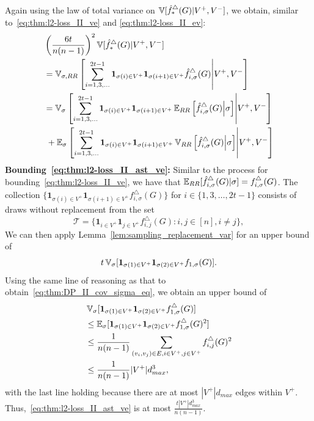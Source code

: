Again using the law of total variance on $\operatorname{\mathbb{V}}[\hat{f}_*^\triangle(G)|V^+,V^-]$, we
obtain, similar to~\eqref{eq:thm:l2-loss_II_ve} and \eqref{eq:thm:l2-loss_II_ev}:
\begin{align}
  &\left(\frac{6t}{n(n-1)}\right)^2\operatorname{\mathbb{V}}[\hat{f}_*^\triangle(G)|V^+,V^-] \nonumber \\
  &=\operatorname{\mathbb{V}}_{\sigma,RR}\left[\sum_{i=1,3,\ldots}^{2t-1} \textbf{1}_{\sigma(i)\in
  V^+}\textbf{1}_{\sigma(i+1) \in V^+} \hat{f}_{i,\sigma}^\triangle(G)\middle| V^+,V^-\right] \nonumber \\
  &=\operatorname{\mathbb{V}}_{\sigma} \left[ \sum_{i=1,3,\ldots}^{2t-1} \textbf{1}_{\sigma(i) \in
  V^+}\textbf{1}_{\sigma(i+1) \in V^+}\operatorname{\mathbb{E}}_{RR}\left[\hat{f}_{i,\sigma}^\triangle(G)\middle|
  \sigma \right]\middle| V^+,V^-\right]\label{eq:thm:l2-loss_II_ast_ve} \\
  &\hspace{1mm} +\operatorname{\mathbb{E}}_{\sigma} \left[\sum_{i=1,3,\ldots}^{2t-1}\textbf{1}_{\sigma(i) \in
  V^+}\textbf{1}_{\sigma(i+1) \in V^+}\operatorname{\mathbb{V}}_{RR}\left[\hat{f}_{i,\sigma}^\triangle(G)\middle|
  \sigma \right]\middle| V^+,V^-\right]\label{eq:thm:l2-loss_II_ast_ev}
\end{align}
\noindent\textbf{Bounding~\eqref{eq:thm:l2-loss_II_ast_ve}:}
Similar to the process for bounding~\eqref{eq:thm:l2-loss_II_ve}, we have that
$\operatorname{\mathbb{E}}_{RR}[\hat{f}_{i,\sigma}^\triangle(G)|\sigma] = f_{i,\sigma}^\triangle(G)$. The
collection $\{\textbf{1}_{\sigma(i) \in V^+}\textbf{1}_{\sigma(i+1)\in V^+}
\allowbreak f_{i,\sigma}^\triangle(G) \}$ for $i \in \{1, 3, \ldots, 2t-1\}$ consists of draws without replacement from the set
\[
  \mathcal{T} = \{\textbf{1}_{i \in V^+} \textbf{1}_{j \in V^+}
  f_{i,j}^\triangle(G) : i,j \in [n], i \neq j\},
\]
We can then apply Lemma~\ref{lem:sampling_replacement_var} for
an upper bound of
\[t \operatorname{\mathbb{V}}_\sigma[\textbf{1}_{\sigma(1)\in
V^+}\textbf{1}_{\sigma(2) \in V^+}f_{1,\sigma}(G)].\] Using the same line of
reasoning as that to obtain~\eqref{eq:thm:DP_II_cov_sigma_eq}, we obtain an
upper bound of
\begin{align*}
  &\operatorname{\mathbb{V}}_\sigma[\textbf{1}_{\sigma(1)\in
  V^+}\textbf{1}_{\sigma(2) \in V^+}f^\triangle_{1,\sigma}(G)] \\
  &\leq
  \operatorname{\mathbb{E}}_\sigma[\textbf{1}_{\sigma(1)\in
  V^+}\textbf{1}_{\sigma(2) \in V^+}f^\triangle_{1,\sigma}(G)^2] \\
  &\leq \frac{1}{n(n-1)} \sum_{(v_i,v_j) \in E, i \in V^+, j \in V^+}
  f_{i,j}^\triangle(G)^2 \\
  &\leq \frac{1}{n(n-1)} |V^+| d_{max}^3,
\end{align*}
with the last line holding because there are at most $|V^+| d_{max}$ edges
within $V^+$. Thus,~\eqref{eq:thm:l2-loss_II_ast_ve} is at most
$\frac{t|V^+|d_{max}^3}{n(n-1)}$.

